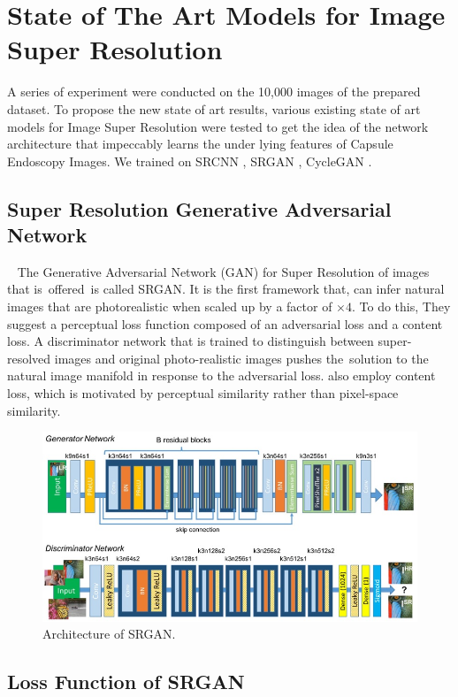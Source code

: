 \chapter{State of The Art Models for Image Super Resolution}
A series of experiment were conducted on the 10,000 images of the prepared dataset.
To propose the new state of art results, various existing state of art models for Image Super Resolution were tested to get the idea of the network architecture that impeccably learns the under lying features of Capsule Endoscopy Images.
\newline
We trained on SRCNN \cite{SRCNN}, SRGAN \cite{SRGAN}, CycleGAN \cite{CycleGAN}.
\section{Super Resolution Generative Adversarial Network} 
The Generative Adversarial Network (GAN) for Super Resolution of images that is offered is called SRGAN. It is the first framework that, can infer natural images that are photorealistic when scaled up by a factor of $\times4$. To do this, They suggest a perceptual loss function composed of an adversarial loss and a content loss. A discriminator network that is trained to distinguish between super-resolved images and original photo-realistic images pushes the solution to the natural image manifold in response to the adversarial loss. also employ content loss, which is motivated by perceptual similarity rather than pixel-space similarity.
\begin{figure}[h]
    \centering
    \includegraphics[totalheight=2.5in]{Chapter5/Fig5.1.jpg}
    \caption[Architecture of SRGAN]{Architecture of SRGAN.\cite{SRGAN}}
    \label{fig:label5.1}
\end{figure}

\section{Loss Function of SRGAN}
